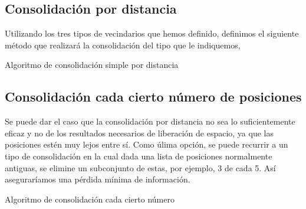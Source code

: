 \documentclass[a4paper, 12pt]{article}
\begin{document}
\subsection{Consolidaci\'on por distancia}

Utilizando los tres tipos de vecindarios que hemos definido, definimos el siguiente m\'etodo que realizar\'a la consolidaci\'on del tipo que le indiquemos, \\


\pagebreak

\begin{algorithm}[h]\label{consolidationByDistance}
\begin{algorithmic}[1]
        \Else
        \EndIf
    \EndIf
        \Else
        \EndIf
    \EndIf
        \Else
        \EndIf
    \EndIf
\EndFor
\EndFunction
\end{algorithmic}
\caption{\label{alg:consolidationByDinstace} Algoritmo de consolidaci\'on simple por distancia}
\end{algorithm}


\subsection{Consolidaci\'on cada cierto n\'umero de posiciones}

Se puede dar el caso que la consolidaci\'on por distancia no sea lo suficientemente eficaz y no de los resultados necesarios de liberaci\'on de espacio, ya que las posiciones est\'en muy lejos entre s\'i. Como \'ulima opci\'on, se puede recurrir a un tipo de consolidaci\'on en la cual dada una lista de posiciones normalmente antiguas, se elimine un subconjunto de estas, por ejemplo, 3 de cada 5. As\'i asegurar\'iamos una p\'erdida m\'inima de informaci\'on. \\

\begin{algorithm}[h]\label{consolidationByEachSomeNumber}
\begin{algorithmic}[1]
			\EndFor
		\EndIf
	\EndFor
\EndFunction
\end{algorithmic}
\caption{\label{alg:consolidationByEach} Algoritmo de consolidaci\'on cada cierto n\'umero}
\end{algorithm}
\end{document}
